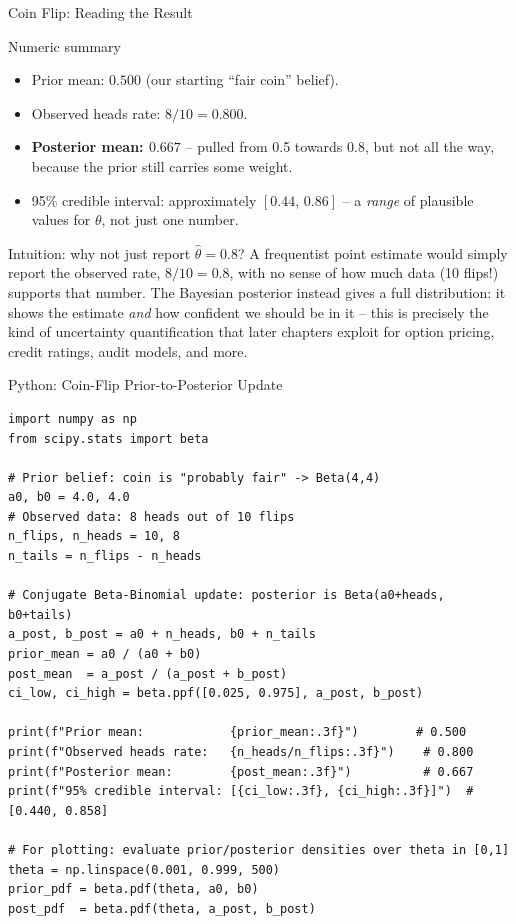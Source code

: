 \documentclass[aspectratio=169,10pt]{beamer}
\newcommand{\thetav}{\theta}
\begin{document}
\begin{frame}{Coin Flip: Reading the Result}
  \begin{block}{Numeric summary}
    \begin{itemize}
      \item Prior mean: $0.500$ (our starting ``fair coin'' belief).
      \item Observed heads rate: $8/10 = 0.800$.
      \item \textbf{Posterior mean: $0.667$} -- pulled from 0.5 towards 0.8,
      but not all the way, because the prior still carries some weight.
      \item 95\% credible interval: approximately $[0.44,\, 0.86]$ -- a
      \emph{range} of plausible values for $\thetav$, not just one number.
    \end{itemize}
  \end{block}
  \begin{block}{Intuition: why not just report $\hat\thetav = 0.8$?}
    A frequentist point estimate would simply report the observed rate,
    $8/10=0.8$, with no sense of how much data (10 flips!) supports that
    number. The Bayesian posterior instead gives a full distribution: it
    shows the estimate \emph{and} how confident we should be in it -- this
    is precisely the kind of uncertainty quantification that later chapters
    exploit for option pricing, credit ratings, audit models, and more.
  \end{block}
\end{frame}

\begin{frame}[fragile]{Python: Coin-Flip Prior-to-Posterior Update}
\begin{lstlisting}
import numpy as np
from scipy.stats import beta

# Prior belief: coin is "probably fair" -> Beta(4,4)
a0, b0 = 4.0, 4.0
# Observed data: 8 heads out of 10 flips
n_flips, n_heads = 10, 8
n_tails = n_flips - n_heads

# Conjugate Beta-Binomial update: posterior is Beta(a0+heads, b0+tails)
a_post, b_post = a0 + n_heads, b0 + n_tails
prior_mean = a0 / (a0 + b0)
post_mean  = a_post / (a_post + b_post)
ci_low, ci_high = beta.ppf([0.025, 0.975], a_post, b_post)

print(f"Prior mean:            {prior_mean:.3f}")        # 0.500
print(f"Observed heads rate:   {n_heads/n_flips:.3f}")    # 0.800
print(f"Posterior mean:        {post_mean:.3f}")          # 0.667
print(f"95% credible interval: [{ci_low:.3f}, {ci_high:.3f}]")  # [0.440, 0.858]

# For plotting: evaluate prior/posterior densities over theta in [0,1]
theta = np.linspace(0.001, 0.999, 500)
prior_pdf = beta.pdf(theta, a0, b0)
post_pdf  = beta.pdf(theta, a_post, b_post)
\end{lstlisting}
\end{frame}
\end{document}
